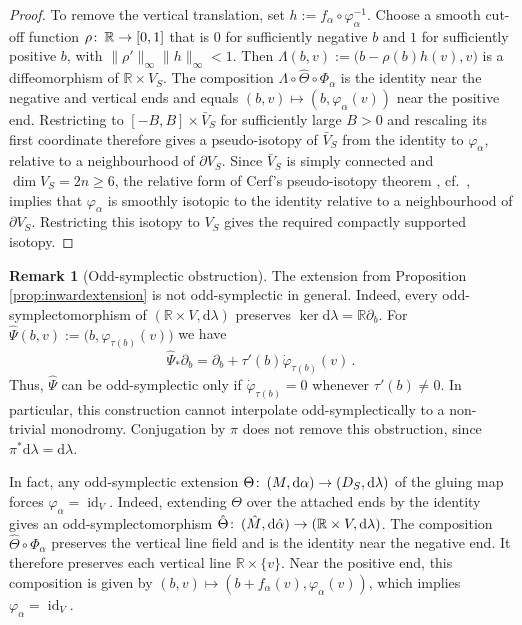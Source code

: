 \documentclass{amsart}
\theoremstyle{definition}
\newtheorem{rem}[prop]{Remark}
\def\co{\colon\thinspace}
\newcommand{\rmd}{\mathrm d}
\newcommand{\R}{\mathbb R}
\newcommand{\ra}{\rightarrow}
\DeclareMathOperator{\id}{\mathrm{id}}
\begin{document}
\begin{proof}
To remove the vertical translation,
set $h:=f_{\alpha}\circ\varphi_{\alpha}^{-1}$.
Choose a smooth cut-off function $\rho\co\R\ra[0,1]$
that is $0$ for sufficiently negative $b$
and $1$ for sufficiently positive $b$,
with $\|\rho'\|_{\infty}\|h\|_{\infty}<1$.
Then $\Lambda(b,v):=\big(b-\rho(b)h(v),v\big)$
is a diffeomorphism of $\R\times V_S$.
The composition $\Lambda\circ\hat{\Theta}\circ\Phi_{\alpha}$
is the identity near the negative and vertical ends
and equals $(b,v)\mapsto(b,\varphi_{\alpha}(v))$
near the positive end.
Restricting to $[-B,B]\times\bar{V}_S$
for sufficiently large $B>0$
and rescaling its first coordinate
therefore gives a pseudo-isotopy of $\bar{V}_S$
from the identity to $\varphi_{\alpha}$,
relative to a neighbourhood of $\partial V_S$.
Since $\bar{V}_S$ is simply connected
and $\dim V_S=2n\geq6$,
the relative form of Cerf's pseudo-isotopy theorem
\cite{cer70}, cf.\ \cite[Introduction]{kra22},
implies that $\varphi_{\alpha}$
is smoothly isotopic to the identity
relative to a neighbourhood of $\partial V_S$.
Restricting this isotopy to $V_S$
gives the required compactly supported isotopy.
\end{proof}


\begin{rem}[Odd-symplectic obstruction]
\label{rem:oddsympobstr}
The extension from Proposition \ref{prop:inwardextension}
is not odd-symplectic in general.
Indeed,
every odd-symplectomorphism of
$(\R\times V,\rmd\lambda)$ preserves
$\ker\rmd\lambda=\R\partial_b$.
For $\hat{\Psi}(b,v):=\bigl(b,\varphi_{\tau(b)}(v)\bigr)$
we have
\[
\hat{\Psi}_*\partial_b=
\partial_b+\tau'(b)\dot\varphi_{\tau(b)}(v)
\,.
\]
Thus, $\hat{\Psi}$ can be odd-symplectic only if
$\dot\varphi_{\tau(b)}=0$ whenever $\tau'(b)\neq0$.
In particular, this construction cannot interpolate
odd-symplectically to a non-trivial monodromy.
Conjugation by $\pi$ does not remove this obstruction,
since $\pi^*\rmd\lambda=\rmd\lambda$.

In fact, any odd-symplectic extension
$\Theta\co(M,\rmd\alpha)\ra(D_S,\rmd\lambda)$
of the gluing map forces $\varphi_{\alpha}=\id_V$.
Indeed, extending $\Theta$ over the attached ends
by the identity gives an odd-symplectomorphism
$\hat{\Theta}\co(\hat{M},\rmd\hat{\alpha})
\ra(\R\times V,\rmd\lambda)$.
The composition $\hat{\Theta}\circ\Phi_{\alpha}$
preserves the vertical line field
and is the identity near the negative end.
It therefore preserves each vertical line
$\R\times\{v\}$.
Near the positive end, this composition is given by
$(b,v)\mapsto(b+f_{\alpha}(v),\varphi_{\alpha}(v))$,
which implies $\varphi_{\alpha}=\id_V$.
\end{rem}
\end{document}

